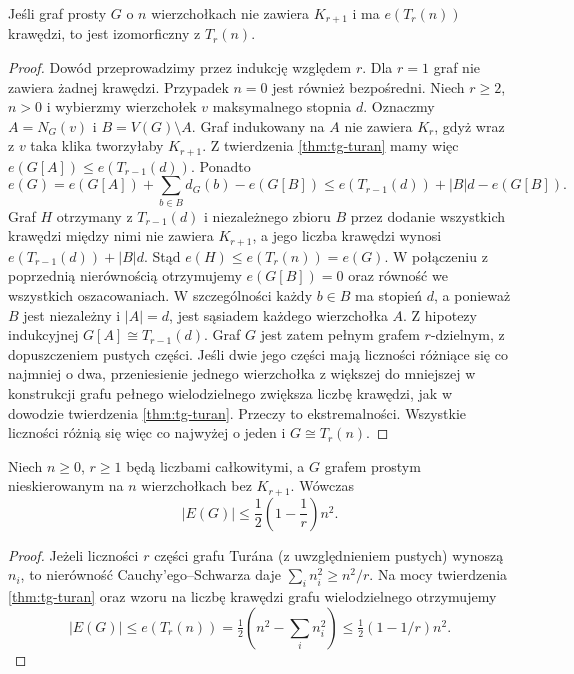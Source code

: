 \begin{stwierdzenie}
\label{prop:tg-turan-unique}
Jeśli graf prosty $G$ o $n$ wierzchołkach
nie zawiera $K_{r+1}$ i ma $e(T_r(n))$ krawędzi,
to jest izomorficzny z $T_r(n)$.
\end{stwierdzenie}
\begin{proof}
Dowód przeprowadzimy przez indukcję względem $r$.
Dla $r=1$ graf nie zawiera żadnej krawędzi.
Przypadek $n=0$ jest również bezpośredni.
Niech $r\geq2$, $n>0$ i wybierzmy wierzchołek
$v$ maksymalnego stopnia $d$. Oznaczmy
$A=N_G(v)$ i $B=V(G)\setminus A$.
Graf indukowany na $A$ nie zawiera $K_r$,
gdyż wraz z $v$ taka klika tworzyłaby $K_{r+1}$.
Z twierdzenia \ref{thm:tg-turan} mamy więc
$e(G[A])\leq e(T_{r-1}(d))$.
Ponadto
\[
e(G)=e(G[A])+\sum_{b\in B}d_G(b)-e(G[B])
\leq e(T_{r-1}(d))+|B|d-e(G[B]).
\]
Graf $H$ otrzymany z $T_{r-1}(d)$ i niezależnego
zbioru $B$ przez dodanie wszystkich krawędzi
między nimi nie zawiera $K_{r+1}$, a jego
liczba krawędzi wynosi $e(T_{r-1}(d))+|B|d$.
Stąd $e(H)\leq e(T_r(n))=e(G)$.
W połączeniu z poprzednią nierównością otrzymujemy
$e(G[B])=0$ oraz równość we wszystkich oszacowaniach.
W szczególności każdy $b\in B$ ma stopień $d$,
a ponieważ $B$ jest niezależny i $|A|=d$,
jest sąsiadem każdego wierzchołka $A$.
Z hipotezy indukcyjnej $G[A]\cong T_{r-1}(d)$.
Graf $G$ jest zatem pełnym grafem $r$-dzielnym,
z dopuszczeniem pustych części.
Jeśli dwie jego części mają liczności różniące
się co najmniej o dwa, przeniesienie jednego
wierzchołka z większej do mniejszej w konstrukcji
grafu pełnego wielodzielnego zwiększa liczbę
krawędzi, jak w dowodzie twierdzenia
\ref{thm:tg-turan}. Przeczy to ekstremalności.
Wszystkie liczności różnią się więc co najwyżej
o jeden i $G\cong T_r(n)$.
\end{proof}

\begin{wniosek}
\label{cor:tg-turan-bound}
Niech $n\geq0$, $r\geq1$ będą liczbami całkowitymi,
a $G$ grafem prostym nieskierowanym na $n$
wierzchołkach bez $K_{r+1}$. Wówczas
\[
|E(G)|\leq\frac12\left(1-\frac1r\right)n^2.
\]
\end{wniosek}
\begin{proof}
Jeżeli liczności $r$ części grafu Turána
(z uwzględnieniem pustych) wynoszą $n_i$,
to nierówność Cauchy'ego--Schwarza daje
$\sum_i n_i^2\geq n^2/r$.
Na mocy twierdzenia \ref{thm:tg-turan} oraz wzoru
na liczbę krawędzi grafu wielodzielnego otrzymujemy
\[
|E(G)|\leq e(T_r(n))
=\tfrac12(n^2-\textstyle\sum_i n_i^2)
\leq\tfrac12(1-1/r)n^2.
\]
\end{proof}

